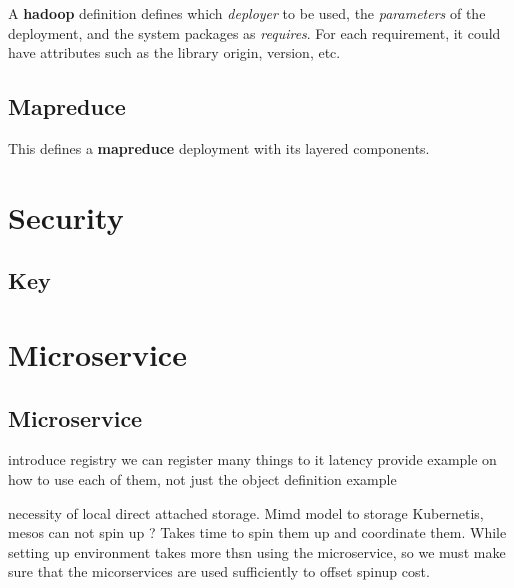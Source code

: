 \documentclass[9pt,twocolumn,twoside]{styles/osajnl}
\begin{document}
A \textbf{hadoop} definition defines which \textit{deployer} to be used,
the \textit{parameters} of the deployment, and the system packages as
\textit{requires}. For each requirement, it could have attributes such
as the library origin, version, etc.



\subsection{Mapreduce}

This defines a \textbf{mapreduce} deployment with its layered
components.


\section{Security}

\subsection{Key}


\section{Microservice}

\subsection{Microservice}

 
introduce registry we can register many things to it 
latency 
provide example on how to use each of them, not just the object definition example 
 
necessity of local direct attached storage. 
Mimd model to storage  
Kubernetis, mesos can not spin up ?  
Takes time to spin them up and coordinate them. While setting up environment takes more thsn using the microservice, so we must make sure that the micorservices are used sufficiently to offset spinup cost. 
 
\end{document}
